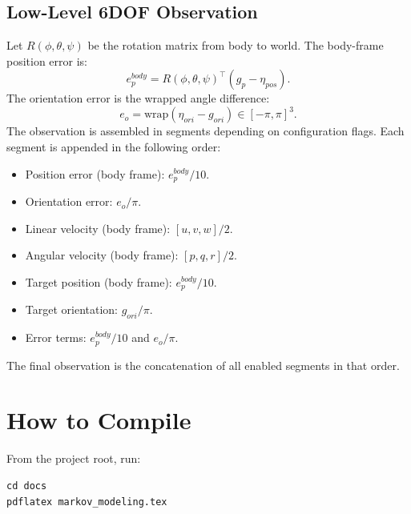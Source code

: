 \documentclass[11pt]{article}
\begin{document}
\subsection{Low-Level 6DOF Observation}
Let $R(\phi,\theta,\psi)$ be the rotation matrix from body to world. The body-frame position error is:
\begin{equation}
 e_p^{body} = R(\phi,\theta,\psi)^\top (g_p - \eta_{pos}).
\end{equation}
The orientation error is the wrapped angle difference:
\begin{equation}
 e_o = \text{wrap}(\eta_{ori} - g_{ori}) \in [-\pi,\pi]^3.
\end{equation}
The observation is assembled in segments depending on configuration flags. Each segment is appended in the following order:
\begin{itemize}
  \item Position error (body frame): $e_p^{body}/10$.
  \item Orientation error: $e_o/\pi$.
  \item Linear velocity (body frame): $[u,v,w]/2$.
  \item Angular velocity (body frame): $[p,q,r]/2$.
  \item Target position (body frame): $e_p^{body}/10$.
  \item Target orientation: $g_{ori}/\pi$.
  \item Error terms: $e_p^{body}/10$ and $e_o/\pi$.
\end{itemize}
The final observation is the concatenation of all enabled segments in that order.

\section{How to Compile}
From the project root, run:
\begin{verbatim}
cd docs
pdflatex markov_modeling.tex
\end{verbatim}
\end{document}
